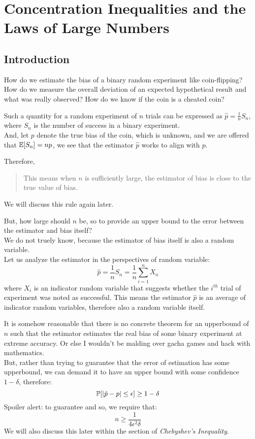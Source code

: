 \chapter{Concentration Inequalities and the Laws of Large Numbers}

\section{Introduction}
How do we estimate the bias of a binary random experiment like coin-flipping? How do we measure the overall deviation of an expected hypothetical result and what was really observed? How do we know if the coin is a cheated coin?

Such a quantity for a random experiment of $n$ trials can be expressed as $\hat{p} = \frac{1}{n} S_n$, where $S_n$ is the number of success in a binary experiment. \\
And, let $p$ denote the true bias of the coin, which is unknown, and we are offered that $\E[S_n] = np$, we see that the estimator $\hat{p}$ works to align with $p$.

Therefore,
\begin{quote}
    This means when $n$ is sufficiently large, the estimator of bias is close to the true value of bias.
\end{quote}
We will discuss this rule again later.

But, how large should $n$ be, so to provide an upper bound to the error between the estimator and bias itself? \\
We do not truely know, because the estimator of bias itself is also a random variable. \\
Let us analyze the estimator in the perspectives of random variable:
\[\hat{p} = \frac{1}{n} S_n = \frac{1}{n} \sum_{i = 1}^n X_n\]
where $X_i$ is an indicator random variable that suggests whether the $i^{th}$ trial of experiment was noted as successful. This means the estimator $\hat{p}$ is an average of indicator random variables, therefore also a random variable itself.

It is somehow reasonable that there is no concrete theorem for an upperbound of $n$ such that the estimator estimates the real bias of some binary experiment at extreme accuracy. Or else I wouldn't be malding over gacha games and hack with mathematics. \\
But, rather than trying to guarantee that the error of estimation has some upperbound, we can demand it to have an upper bound with some confidence $1 - \delta$, therefore:
\[\P[|\hat{p} - p| \leq \epsilon] \geq 1 - \delta\]
Spoiler alert: to guarantee and so, we require that:
\[n \geq \frac{1}{4 \epsilon^2 \delta}\]
We will also discuss this later within the section of \textit{Chebyshev's Inequality}.

